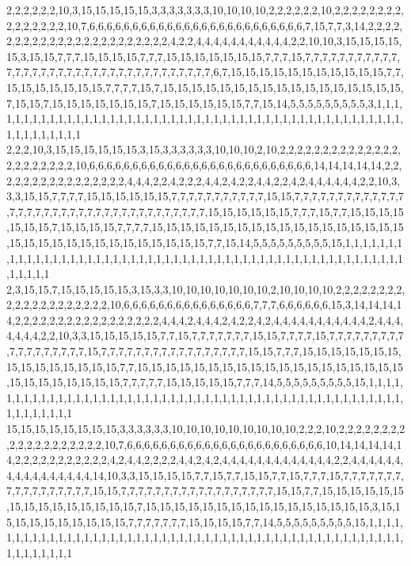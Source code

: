 2,2,2,2,2,2,10,3,15,15,15,15,15,3,3,3,3,3,3,3,10,10,10,10,2,2,2,2,2,2,10,2,2,2,2,2,2,2,2,2,2,2,2,2,2,2,10,7,6,6,6,6,6,6,6,6,6,6,6,6,6,6,6,6,6,6,6,6,6,6,6,6,6,7,15,7,7,3,14,2,2,2,2,2,2,2,2,2,2,2,2,2,2,2,2,2,2,2,2,2,2,2,4,2,2,4,4,4,4,4,4,4,4,4,4,4,2,2,10,10,3,15,15,15,15,15,3,15,15,7,7,7,15,15,15,15,7,7,7,15,15,15,15,15,15,15,7,7,7,15,7,7,7,7,7,7,7,7,7,7,7,7,7,7,7,7,7,7,7,7,7,7,7,7,7,7,7,7,7,7,7,7,7,7,7,6,7,15,15,15,15,15,15,15,15,15,15,15,7,7,15,15,15,15,15,15,15,7,7,7,7,15,7,15,15,15,15,15,15,15,15,15,15,15,15,15,15,15,15,15,7,15,15,7,15,15,15,15,15,15,15,7,15,15,15,15,15,15,7,7,15,14,5,5,5,5,5,5,5,5,5,3,1,1,1,1,1,1,1,1,1,1,1,1,1,1,1,1,1,1,1,1,1,1,1,1,1,1,1,1,1,1,1,1,1,1,1,1,1,1,1,1,1,1,1,1,1,1,1,1,1,1,1,1,1,1,1,1,1,1
2,2,2,10,3,15,15,15,15,15,15,3,15,3,3,3,3,3,3,10,10,10,2,10,2,2,2,2,2,2,2,2,2,2,2,2,2,2,2,2,2,2,2,2,2,2,10,6,6,6,6,6,6,6,6,6,6,6,6,6,6,6,6,6,6,6,6,6,6,6,6,6,6,14,14,14,14,14,2,2,2,2,2,2,2,2,2,2,2,2,2,2,2,2,4,4,4,2,2,4,2,2,2,4,4,2,4,2,2,4,4,2,2,4,2,4,4,4,4,4,4,2,2,10,3,3,3,15,15,7,7,7,7,15,15,15,15,15,15,7,7,7,7,7,7,7,7,7,7,7,15,15,7,7,7,7,7,7,7,7,7,7,7,7,7,7,7,7,7,7,7,7,7,7,7,7,7,7,7,7,7,7,7,7,7,7,7,7,15,15,15,15,15,15,7,7,7,15,7,7,15,15,15,15,15,15,15,7,15,15,15,15,7,7,7,7,15,15,15,15,15,15,15,15,15,15,15,15,15,15,15,15,15,15,15,15,15,15,15,15,15,15,15,15,15,15,15,15,7,7,15,14,5,5,5,5,5,5,5,5,5,15,1,1,1,1,1,1,1,1,1,1,1,1,1,1,1,1,1,1,1,1,1,1,1,1,1,1,1,1,1,1,1,1,1,1,1,1,1,1,1,1,1,1,1,1,1,1,1,1,1,1,1,1,1,1,1,1,1,1
2,3,15,15,7,15,15,15,15,15,3,15,3,3,10,10,10,10,10,10,10,2,10,10,10,10,2,2,2,2,2,2,2,2,2,2,2,2,2,2,2,2,2,2,2,2,10,6,6,6,6,6,6,6,6,6,6,6,6,6,6,6,7,7,7,6,6,6,6,6,6,15,3,14,14,14,14,2,2,2,2,2,2,2,2,2,2,2,2,2,2,2,2,2,4,4,4,2,4,4,4,2,4,2,2,4,2,4,4,4,4,4,4,4,4,4,4,4,2,4,4,4,4,4,4,4,2,2,10,3,3,15,15,15,15,15,7,7,15,7,7,7,7,7,7,7,15,15,7,7,7,7,15,7,7,7,7,7,7,7,7,7,7,7,7,7,7,7,7,7,7,15,7,7,7,7,7,7,7,7,7,7,7,7,7,7,7,7,7,15,15,7,7,7,15,15,15,15,15,15,15,15,15,15,15,15,15,15,15,7,7,15,15,15,15,15,15,15,15,15,15,15,15,15,15,15,15,15,15,15,15,15,15,15,15,15,15,15,7,7,7,7,7,15,15,15,15,15,7,7,7,14,5,5,5,5,5,5,5,5,5,15,1,1,1,1,1,1,1,1,1,1,1,1,1,1,1,1,1,1,1,1,1,1,1,1,1,1,1,1,1,1,1,1,1,1,1,1,1,1,1,1,1,1,1,1,1,1,1,1,1,1,1,1,1,1,1,1,1,1
15,15,15,15,15,15,15,15,3,3,3,3,3,3,10,10,10,10,10,10,10,10,10,2,2,2,10,2,2,2,2,2,2,2,2,2,2,2,2,2,2,2,2,2,2,2,10,7,6,6,6,6,6,6,6,6,6,6,6,6,6,6,6,6,6,6,6,6,6,6,6,10,14,14,14,14,14,2,2,2,2,2,2,2,2,2,2,2,4,2,4,4,2,2,2,2,4,4,2,4,2,4,4,4,4,4,4,4,4,4,4,4,4,4,2,2,4,4,4,4,4,4,4,4,4,4,4,4,4,4,4,4,14,10,3,3,15,15,15,15,7,7,15,7,7,15,15,7,7,15,7,7,7,15,7,7,7,7,7,7,7,7,7,7,7,7,7,7,7,7,7,15,15,7,7,7,7,7,7,7,7,7,7,7,7,7,7,7,7,7,7,15,15,7,7,15,15,15,15,15,15,15,15,15,15,15,15,15,15,15,7,15,15,15,15,15,15,15,15,15,15,15,15,15,15,15,15,3,15,15,15,15,15,15,15,15,15,15,7,7,7,7,7,7,7,15,15,15,15,7,7,14,5,5,5,5,5,5,5,5,5,15,1,1,1,1,1,1,1,1,1,1,1,1,1,1,1,1,1,1,1,1,1,1,1,1,1,1,1,1,1,1,1,1,1,1,1,1,1,1,1,1,1,1,1,1,1,1,1,1,1,1,1,1,1,1,1,1,1,1
